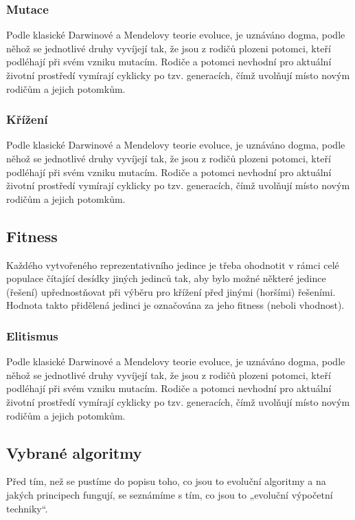 \documentclass[bc,male,java,dept460]{diploma}		%
\begin{document}
\subsubsection{Mutace}
Podle klasické Darwinové a Mendelovy teorie evoluce, je uznáváno dogma, podle něhož se jednotlivé druhy vyvíjejí tak, že jsou z rodičů plozeni potomci, kteří podléhají při svém vzniku mutacím. Rodiče a potomci nevhodní pro aktuální životní prostředí vymírají cyklicky po tzv. generacích, čímž uvolňují místo novým rodičům a jejich potomkům.

\subsubsection{Křížení}
Podle klasické Darwinové a Mendelovy teorie evoluce, je uznáváno dogma, podle něhož se jednotlivé druhy vyvíjejí tak, že jsou z rodičů plozeni potomci, kteří podléhají při svém vzniku mutacím. Rodiče a potomci nevhodní pro aktuální životní prostředí vymírají cyklicky po tzv. generacích, čímž uvolňují místo novým rodičům a jejich potomkům.

\subsection{Fitness}
Každého vytvořeného reprezentativního jedince je třeba ohodnotit v rámci celé populace čítající desídky jiných jedinců tak, aby bylo možné některé jedince (řešení) upřednostňovat při výběru pro křížení před jinými (horšími) řešeními.
Hodnota takto přidělená jedinci je označována za jeho fitness (neboli vhodnost).

\subsubsection{Elitismus}
Podle klasické Darwinové a Mendelovy teorie evoluce, je uznáváno dogma, podle něhož se jednotlivé druhy vyvíjejí tak, že jsou z rodičů plozeni potomci, kteří podléhají při svém vzniku mutacím. Rodiče a potomci nevhodní pro aktuální životní prostředí vymírají cyklicky po tzv. generacích, čímž uvolňují místo novým rodičům a jejich potomkům.

\subsection{Vybrané algoritmy}
Před tím, než se pustíme do popisu toho, co jsou to evoluční algoritmy a na jakých principech fungují, se seznámíme s tím, co jsou to „evoluční výpočetní techniky“.
\end{document}
